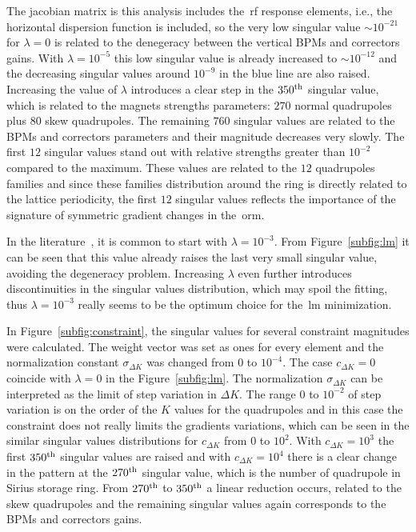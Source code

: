 The jacobian matrix is this analysis includes the~\gls{rf} response elements, i.e., the horizontal dispersion function is included, so the very low singular value $\sim10^{-21}$ for $\lambda = 0$ is related to the denegeracy between the vertical BPMs and correctors gains. With $\lambda = 10^{-5}$ this low singular value is already increased to $\sim10^{-12}$ and the decreasing singular values around $10^{-9}$ in the blue line are also raised. Increasing the value of $\lambda$ introduces a clear step in the $350\textsuperscript{th}$ singular value, which is related to the magnets strengths parameters: $270$ normal quadrupoles plus $80$ skew quadrupoles. The remaining $760$ singular values are related to the BPMs and correctors parameters and their magnitude decreases very slowly. The first $12$ singular values stand out with relative strengths greater than $10^{-2}$ compared to the maximum. These values are related to the $12$ quadrupoles families and since these families distribution around the ring is directly related to the lattice periodicity, the first $12$ singular values reflects the importance of the signature of symmetric gradient changes in the~\gls{orm}. 

In the literature~\cite{icfa_huang, huang2013}, it is common to start with $\lambda = 10^{-3}$. From Figure~\ref{subfig:lm} it can be seen that this value already raises the last very small singular value, avoiding the degeneracy problem. Increasing $\lambda$ even further introduces discontinuities in the singular values distribution, which may spoil the fitting, thus $\lambda = 10^{-3}$ really seems to be the optimum choice for the~\gls{lm} minimization.

In Figure~\ref{subfig:constraint}, the singular values for several constraint magnitudes were calculated. The weight vector was set as ones for every element and the normalization constant $\sigma_{\Delta K}$ was changed from $0$ to $10^{-4}$. The case $c_{\Delta K} = 0$ coincide with $\lambda = 0$ in the Figure~\ref{subfig:lm}. The normalization $\sigma_{\Delta K}$ can be interpreted as the limit of step variation in $\Delta K$. The range $0$ to $10^{-2}$ of step variation is on the order of the $K$ values for the quadrupoles and in this case the constraint does not really limits the gradients variations, which can be seen in the similar singular values distributions for $c_{\Delta K}$ from $0$ to $10^{2}$. With $c_{\Delta K}=10^{3}$ the first $350\textsuperscript{th}$ singular values are raised and with $c_{\Delta K}=10^{4}$ there is a clear change in the pattern at the $270\textsuperscript{th}$ singular value, which is the number of quadrupole in Sirius storage ring. From $270\textsuperscript{th}$ to $350\textsuperscript{th}$ a linear reduction occurs, related to the skew quadrupoles and the remaining singular values again corresponds to the BPMs and correctors gains. 

